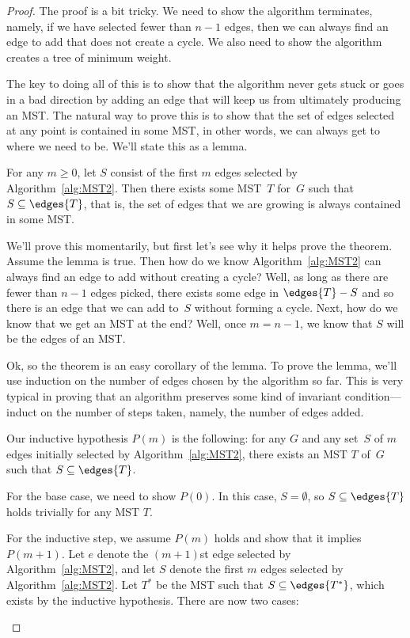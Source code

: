 \begin{proof}
The proof is a bit tricky.  We need to show the algorithm terminates,
namely, if we have selected fewer than $n - 1$ edges, then we can
always find an edge to add that does not create a cycle.  We also need
to show the algorithm creates a tree of minimum weight.

The key to doing all of this is to show that the algorithm never gets
stuck or goes in a bad direction by adding an edge that will keep us
from ultimately producing an MST\@.  The natural way to prove this is
to show that the set of edges selected at any point is contained in
some MST, in other words, we can always get to where we need to be.
We'll state this as a lemma.

\begin{lemma}\label{lemma:MST2}
  For any $m \ge 0$, let $S$ consist of the first $m$ edges selected by
  Algorithm~\ref{alg:MST2}.  Then there exists some MST~$T$ for~$G$ such
  that $S \subseteq \edges{T}$, that is, the set of edges that we are
  growing is always contained in some MST\@.
\end{lemma}

We'll prove this momentarily, but first let's see why it helps prove
the theorem.  Assume the lemma is true.  Then how do we know
Algorithm~\ref{alg:MST2} can always find an edge to add without
creating a cycle?  Well, as long as there are fewer than $n - 1$ edges
picked, there exists some edge in $\edges{T} - S$ and so there is an
edge that we can add to~$S$ without forming a cycle.  Next, how do we
know that we get an MST at the end?  Well, once $m = n - 1$, we know
that $S$ will  be the edges of an
MST\@.

Ok, so the theorem is an easy corollary of the lemma.  To prove the
lemma, we'll use induction on the number of edges chosen by the
algorithm so far.  This is very typical in proving that an algorithm
preserves some kind of invariant condition---induct on the number of
steps taken, namely, the number of edges added.

Our inductive hypothesis $P(m)$ is the following: for any $G$ and any
set~$S$ of $m$ edges initially selected by Algorithm~\ref{alg:MST2},
there exists an MST $T$ of~$G$ such that $S \subseteq \edges{T}$.

For the base case, we need to show $P(0)$.  In this case, $S =
\emptyset$, so $S \subseteq \edges{T}$ holds trivially for any MST
$T$.

For the inductive step, we assume $P(m)$ holds and show that it
implies $P(m + 1)$.  Let $e$ denote the $(m+1)$st edge selected by
Algorithm~\ref{alg:MST2}, and let $S$ denote the first $m$ edges
selected by Algorithm~\ref{alg:MST2}.  Let $T^*$ be the
MST such that $S \subseteq \edges{T^*}$, which exists by the inductive
hypothesis.  There are now two cases:
\begin{description}


\end{description}
\end{proof}
